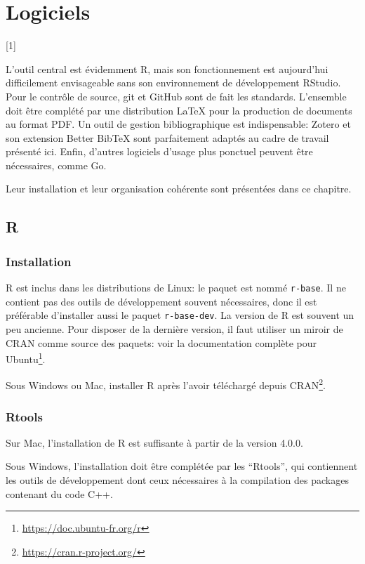 \documentclass[
  12pt,
  french,
  a4paper,
  extrafontsizes,onecolumn,openright
  ]{memoir}
\newlength{\rf}
\newcommand{\toc}[1]{%
  \startcontents[chapters]%
  \printcontents[chapters]{}{1}[#1]{}%
  ~\newline%
}
\begin{document}
\mainmatter

\chapter{Logiciels}\label{chap-logiciels}

\toc{1}

L'outil central est évidemment R, mais son fonctionnement est aujourd'hui difficilement envisageable sans son environnement de développement RStudio.
Pour le contrôle de source, git et GitHub sont de fait les standards.
L'ensemble doit être complété par une distribution LaTeX pour la production de documents au format PDF.
Un outil de gestion bibliographique est indispensable: Zotero et son extension Better BibTeX sont parfaitement adaptés au cadre de travail présenté ici.
Enfin, d'autres logiciels d'usage plus ponctuel peuvent être nécessaires, comme Go.

Leur installation et leur organisation cohérente sont présentées dans ce chapitre.

\section{R}\label{r}

\subsection{Installation}\label{installation}

R est inclus dans les distributions de Linux: le paquet est nommé \texttt{r-base}.
Il ne contient pas des outils de développement souvent nécessaires, donc il est préférable d'installer aussi le paquet \texttt{r-base-dev}.
La version de R est souvent un peu ancienne.
Pour disposer de la dernière version, il faut utiliser un miroir de CRAN comme source des paquets: voir la documentation complète pour Ubuntu\footnote{\url{https://doc.ubuntu-fr.org/r}}.

Sous Windows ou Mac, installer R après l'avoir téléchargé depuis CRAN\footnote{\url{https://cran.r-project.org/}}.

\subsection{Rtools}\label{rtools}

Sur Mac, l'installation de R est suffisante à partir de la version 4.0.0.

Sous Windows, l'installation doit être complétée par les \enquote{Rtools}, qui contiennent les outils de développement dont ceux nécessaires à la compilation des packages contenant du code C++.
\end{document}
